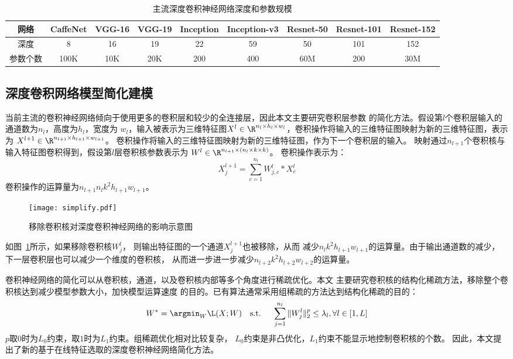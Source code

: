\begin{table}[htbp]
    \centering
    \caption{主流深度卷积神经网络深度和参数规模}
    \label{tab:cnn-size}
    \footnotesize
    \begin{tabular}{|c|c|c|c|c|c|c|c|c|}
        \hline
        网络 & CaffeNet & VGG-16 & VGG-19 & Inception & Inception-v3 & Resnet-50
        & Resnet-101 & Resnet-152 \\
        \hline
        深度 & 8 & 16 & 19 & 22 & 59 & 50 & 101 & 152\\
        参数个数 & 100K & 10K & 20K & 200 & 400 & 60M & 200 & 30M \\
        \hline
    \end{tabular}
\end{table}
\subsection{深度卷积网络模型简化建模}
当前主流的卷积神经网络倾向于使用更多的卷积层和较少的全连接层，因此本文主要研究卷积层参数
的简化方法。假设第$l$个卷积层输入的通道数为$n_l$，高度为$h_l$，宽度为
$w_l$，输入被表示为三维特征图$X^l \in \R^{n_l \times h_l \times
w_l}$，卷积操作将输入的三维特征图映射为新的三维特征图，表示为
$X^{l+1} \in \R^{n_{l+1} \times h_{l+1} \times w_{l+1}}$。
卷积操作将输入的三维特征图映射为新的三维特征图，作为下一个卷积层的输入。
映射通过$n_{l+1}$个卷积核与输入特征图卷积得到，假设第$l$层卷积核参数表示为
$W^l\in \R^{n_{l+1} \times (n_l \times k \times k)}$。
卷积操作表示为：
\begin{equation}
    X_j^{l+1} = \sum_{c=1}^{n_l}{W_{j,c}^l \ast X_c^l}
\end{equation}
卷积操作的运算量为$n_{l+1} n_l k^2 h_{l+1} w_{l+1}$。

\begin{figure}[ht]
    \center
    \texttt{[image: simplify.pdf]}
    \caption{移除卷积核对深度卷积神经网络的影响示意图}
    \label{fig:cnn-simplify}
\end{figure}
如图~\ref{fig:cnn-simplify}所示，如果移除卷积核$W^l_j$，
则输出特征图的一个通道$X_j^{l+1}$也被移除，从而
减少$n_l k^2 h_{l+1} w_{l+1}$的运算量。由于输出通道数的减少，
下一层卷积层也可以减少一个维度的卷积核，
从而进一步进一步减少$n_{l+2}k^2h_{l+2}w_{l+2}$的运算量。

卷积神经网络的简化可以从卷积核，通道，以及卷积核内部等多个角度进行稀疏优化。本文
主要研究卷积核的结构化稀疏方法，移除整个卷积核达到减少模型参数大小，加快模型运算速度
的目的。已有算法通常采用组稀疏的方法达到结构化稀疏的目的：
\begin{equation}
    W^* = \argmin_{W} \L(X;W) \text{\quad s.t. \quad} \sum_{j=1}^{n_l}\|W_j^l\|_2^p \leq
    \lambda_l, \forall l \in [1,L]
\end{equation}
$p$取$0$时为$L_0$约束，取$1$时为$L_1$约束。组稀疏优化相对比较复杂，
$L_0$约束是非凸优化，$L_1$约束不能显示地控制卷积核的个数。
因此，本文提出了新的基于在线特征选取的深度卷积神经网络简化方法。

